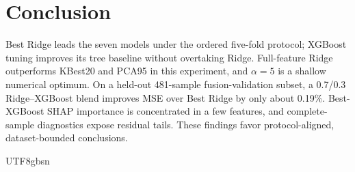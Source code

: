 \documentclass[sigconf,screen,review,anonymous]{acmart}
\begin{document}
\section{Conclusion}
Best Ridge leads the seven models under the ordered five-fold protocol; XGBoost tuning improves its tree baseline without overtaking Ridge. Full-feature Ridge outperforms KBest20 and PCA95 in this experiment, and $\alpha=5$ is a shallow numerical optimum. On a held-out 481-sample fusion-validation subset, a 0.7/0.3 Ridge--XGBoost blend improves MSE over Best Ridge by only about 0.19\%. Best-XGBoost SHAP importance is concentrated in a few features, and complete-sample diagnostics expose residual tails. These findings favor protocol-aligned, dataset-bounded conclusions.

\balance
\begin{CJK*}{UTF8}{gbsn}


\end{CJK*}
\end{document}
